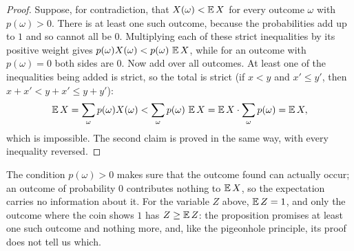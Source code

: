 \begin{proof}
Suppose, for contradiction, that $X(\omega)<\operatorname{\mathbb E} X$ for every outcome $\omega$ with $p(\omega)>0$. There is at least one such outcome, because the probabilities add up to $1$ and so cannot all be $0$. Multiplying each of these strict inequalities by its positive weight gives $p(\omega)X(\omega)<p(\omega)\,\operatorname{\mathbb E} X$, while for an outcome with $p(\omega)=0$ both sides are $0$. Now add over all outcomes. At least one of the inequalities being added is strict, so the total is strict (if $x<y$ and $x'\le y'$, then $x+x'<y+x'\le y+y'$):
\[
\operatorname{\mathbb E} X=\sum_{\omega}p(\omega)X(\omega)<\sum_{\omega}p(\omega)\,\operatorname{\mathbb E} X=\operatorname{\mathbb E} X\cdot\sum_\omega p(\omega)=\operatorname{\mathbb E} X,
\]
which is impossible. The second claim is proved in the same way, with every inequality reversed.
\end{proof}

The condition $p(\omega)>0$ makes sure that the outcome found can actually occur; an outcome of probability $0$ contributes nothing to $\operatorname{\mathbb E} X$, so the expectation carries no information about it. For the variable $Z$ above, $\operatorname{\mathbb E} Z=1$, and only the outcome where the coin shows $1$ has $Z\ge\operatorname{\mathbb E} Z$: the proposition promises at least one such outcome and nothing more, and, like the pigeonhole principle, its proof does not tell us which.
